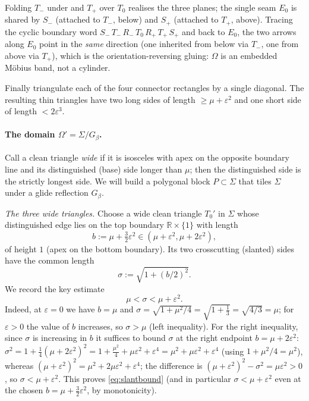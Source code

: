 \documentclass[12pt]{article}
\newcommand{\R}{\mathbb{R}}
\newcommand{\eps}{\varepsilon}
\newcommand{\Sig}{\Sigma}
\begin{document}
Folding $T_-$ under and $T_+$ over $T_0$ realises the three planes; the
single seam $E_0$ is shared by $S_-$ (attached to $T_-$, below) and $S_+$
(attached to $T_+$, above). Tracing the cyclic boundary word
$S_-\,T_-\,R_-\,T_0\,R_+\,T_+\,S_+$ and back to $E_0$, the two arrows
along $E_0$ point in the \emph{same} direction (one inherited from below
via $T_-$, one from above via $T_+$), which is the orientation-reversing
gluing: $\Omega$ is an embedded M\"obius band, not a cylinder.

Finally triangulate each of the four connector rectangles by a single
diagonal. The resulting thin triangles have two long sides of length
$\ge\mu+\eps^2$ and one short side of length $<2\eps^3$.

\paragraph{The domain $\Omega'=\Sig/G_\beta$.}
Call a clean triangle \emph{wide} if it is isosceles with apex on the
opposite boundary line and its distinguished (base) side longer than
$\mu$; then the distinguished side is the strictly longest side. We will
build a polygonal block $P\subset\Sig$ that tiles $\Sig$ under a glide
reflection $G_\beta$.

\smallskip
\emph{The three wide triangles.}
Choose a wide clean triangle $T_0'$ in $\Sig$ whose distinguished edge
lies on the top boundary $\R\times\{1\}$ with length
\[
b:=\mu+\tfrac32\eps^2\in(\mu+\eps^2,\mu+2\eps^2),
\]
of height $1$ (apex on the bottom boundary). Its two crosscutting
(slanted) sides have the common length
\begin{equation}\label{eq:slant}
\sigma:=\sqrt{1+(b/2)^2}.
\end{equation}
We record the key estimate
\begin{equation}\label{eq:slantbound}
\mu<\sigma<\mu+\eps^2 .
\end{equation}
Indeed, at $\eps=0$ we have $b=\mu$ and
$\sigma=\sqrt{1+\mu^2/4}=\sqrt{1+\tfrac13}=\sqrt{4/3}=\mu$; for $\eps>0$
the value of $b$ increases, so $\sigma>\mu$ (left inequality). For the
right inequality, since $\sigma$ is increasing in $b$ it suffices to bound
$\sigma$ at the right endpoint $b=\mu+2\eps^2$:
$\sigma^2=1+\tfrac14(\mu+2\eps^2)^2=1+\tfrac{\mu^2}4+\mu\eps^2+\eps^4
=\mu^2+\mu\eps^2+\eps^4$ (using $1+\mu^2/4=\mu^2$), whereas
$(\mu+\eps^2)^2=\mu^2+2\mu\eps^2+\eps^4$; the difference is
$(\mu+\eps^2)^2-\sigma^2=\mu\eps^2>0$, so $\sigma<\mu+\eps^2$. This proves
\eqref{eq:slantbound} (and in particular $\sigma<\mu+\eps^2$ even at the
chosen $b=\mu+\tfrac32\eps^2$, by monotonicity).
\end{document}
